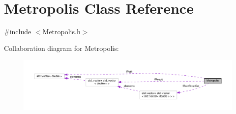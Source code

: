 \hypertarget{classMetropolis}{}\section{Metropolis Class Reference}
\label{classMetropolis}


{\ttfamily \#include $<$Metropolis.\+h$>$}



Collaboration diagram for Metropolis\+:
\nopagebreak
\begin{figure}[H]
\begin{center}
\leavevmode
\includegraphics[width=350pt]{classMetropolis__coll__graph}
\end{center}
\end{figure}
